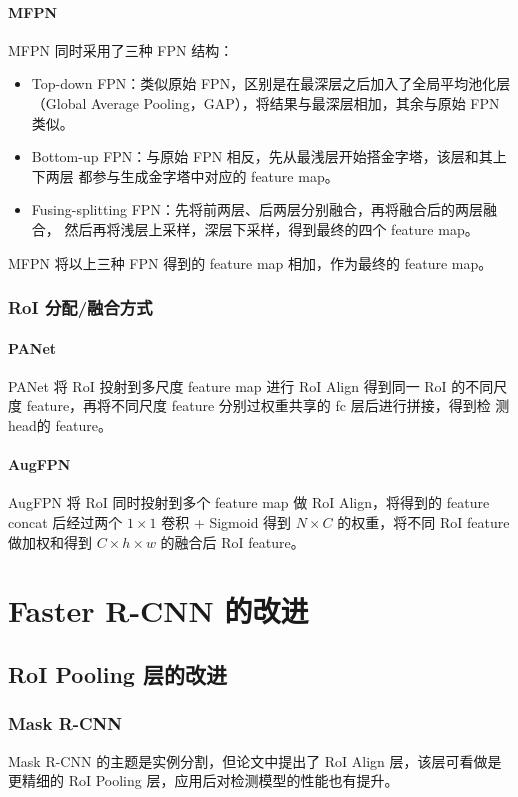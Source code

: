 \paragraph{MFPN}
MFPN 同时采用了三种 FPN 结构：

\begin{itemize}
  \item Top-down FPN：类似原始 FPN，区别是在最深层之后加入了全局平均池化层
    （Global Average Pooling，GAP），将结果与最深层相加，其余与原始 FPN 类似。
  \item Bottom-up FPN：与原始 FPN 相反，先从最浅层开始搭金字塔，该层和其上下两层
    都参与生成金字塔中对应的 feature map。
  \item Fusing-splitting FPN：先将前两层、后两层分别融合，再将融合后的两层融合，
    然后再将浅层上采样，深层下采样，得到最终的四个 feature map。
\end{itemize}

MFPN 将以上三种 FPN 得到的 feature map 相加，作为最终的 feature map。

\subsubsection{RoI 分配/融合方式}
\paragraph{PANet}
PANet 将 RoI 投射到多尺度 feature map 进行 RoI Align 得到同一 RoI 的不同尺
度 feature，再将不同尺度 feature 分别过权重共享的 fc 层后进行拼接，得到检
测 head的 feature\cite{2018-PANet}。

\paragraph{AugFPN}
AugFPN 将 RoI 同时投射到多个 feature map 做 RoI Align，将得到的 feature concat
后经过两个 $1 \times 1$ 卷积 + Sigmoid 得到 $N \times C$ 的权重，将不同 RoI
feature 做加权和得到 $C \times h \times w$ 的融合后 RoI feature\cite{2019-AugFPN}。

\section{Faster R-CNN 的改进}
\label{sec:faster-improve}

\subsection{RoI Pooling 层的改进}
\subsubsection{Mask R-CNN}
Mask R-CNN 的主题是实例分割，但论文中提出了 RoI Align 层，该层可看做是更精细的 RoI
Pooling 层，应用后对检测模型的性能也有提升。

